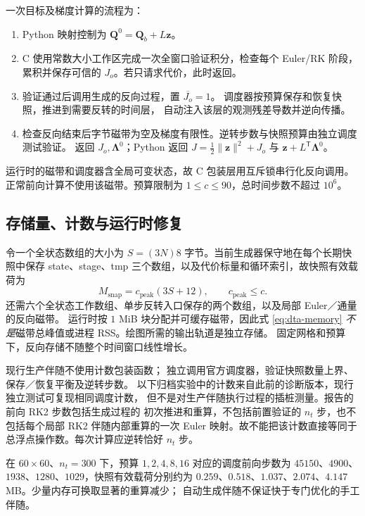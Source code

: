 \documentclass[12pt,a4paper]{article}
\newcommand{\Q}{\mathbf{Q}}
\newcommand{\LL}{\bm{\Lambda}}
\newcommand{\trans}{^{\mathsf T}}
\begin{document}
一次目标及梯度计算的流程为：
\begin{enumerate}
 \item Python 映射控制为 $\Q^0=\Q_b+L\mathbf z$。
 \item C 使用常数大小工作区完成一次全窗口验证积分，检查每个 Euler/RK 阶段，
       累积并保存可信的 $J_o$。若只请求代价，此时返回。
 \item 验证通过后调用生成的反向过程，置 $\overline{J_o}=1$。
       调度器按预算保存和恢复快照，推进到需要反转的时间层，
       自动注入该层的观测残差导数并逆向传播。
 \item 检查反向结束后字节磁带为空及梯度有限性。逆转步数与快照预算由独立调度测试验证。
       返回 $J_o,\LL^0$；Python 返回
       $J=\tfrac12\|\mathbf z\|^2+J_o$ 与 $\mathbf z+L\trans\LL^0$。
\end{enumerate}
运行时的磁带和调度器含全局可变状态，故 C 包装层用互斥锁串行化反向调用。
正常前向计算不使用该磁带。预算限制为 $1\le c\le90$，总时间步数不超过 $10^6$。

\subsection{存储量、计数与运行时修复}

令一个全状态数组的大小为 $S=(3N)8$ 字节。当前生成器保守地在每个长期快照中保存
state、stage、tmp 三个数组，以及代价标量和循环索引，故快照有效载荷为
\begin{equation}
 M_{\mathrm{snap}}=c_{\mathrm{peak}}(3S+12),\qquad c_{\mathrm{peak}}\le c.
 \label{eq:dta-memory}
\end{equation}
还需六个全状态工作数组、单步反转入口保存的两个数组，以及局部 Euler／通量的反向磁带。
运行时按 $1$ MiB 块分配并可缓存磁带，因此式 \eqref{eq:dta-memory}
\emph{不是}磁带总峰值或进程 RSS。绘图所需的输出轨道是独立存储。
固定网格和预算下，反向存储不随整个时间窗口线性增长。

现行生产伴随不使用计数包装函数；
独立调用官方调度器，验证快照数量上界、保存／恢复平衡及逆转步数。
以下归档实验中的计数来自此前的诊断版本，现行独立测试可复现相同调度计数，
但不是对生产伴随执行过程的插桩测量。报告的前向 RK2 步数包括生成过程的
初次推进和重算，不包括前置验证的 $n_t$ 步，也不包括每个局部 RK2 伴随内部重算的一次
Euler 映射。故不能把该计数直接等同于总浮点操作数。每次计算应逆转恰好 $n_t$ 步。

在 $60\times60$、$n_t=300$ 下，预算 $1,2,4,8,16$ 对应的调度前向步数为
$45150$、$4900$、$1938$、$1280$、$1029$，快照有效载荷分别约为
$0.259$、$0.518$、$1.037$、$2.074$、$4.147$ MB。少量内存可换取显著的重算减少；
自动生成伴随不保证快于专门优化的手工伴随。
\end{document}
